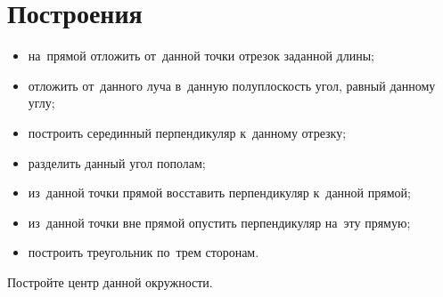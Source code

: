 
\section*{Построения}


\begin{itemize}

\item
на~прямой отложить от~данной точки отрезок заданной длины;

\item
отложить от~данного луча в~данную полуплоскость угол, равный данному углу;

\item
построить серединный перпендикуляр к~данному отрезку;

\item
разделить данный угол пополам;

\item
из~данной точки прямой восставить перпендикуляр к~данной прямой;

\item
из~данной точки вне прямой опустить перпендикуляр на~эту прямую;

\item
построить треугольник по~трем сторонам.

\end{itemize}

Постройте центр данной окружности.


